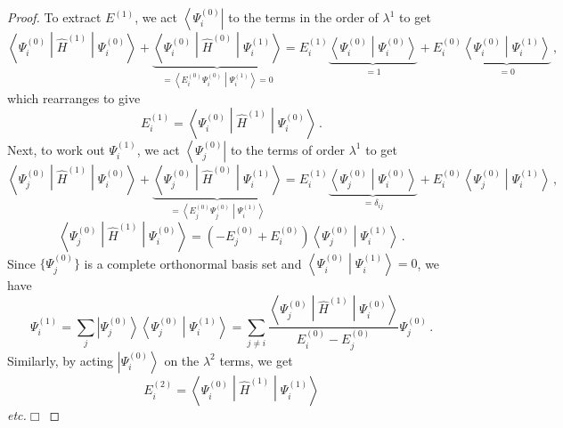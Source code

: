 \documentclass{article}
\theoremstyle{plain}\theoremheaderfont{\normalfont\itshape}\theorembodyfont{\rmfamily}\theoremseparator{.}\newtheorem*{rem}{Remark}\newtheorem*{ex}{Example}\newtheorem*{proof}{Proof}\newtheorem*{altp}{Alternative proof}
\theoremstyle{plain}\theoremheaderfont{\normalfont\bfseries}\theorembodyfont{\rmfamily}\theoremseparator{.}\newtheorem{thm}{Theorem}[section]\newtheorem{lem}[thm]{Lemma}\newtheorem{prop}[thm]{Proposition}\newtheorem*{cor}{Corollary}\newtheorem{defn}[thm]{Definition}\newtheorem{clm}[thm]{Claim}\newtheorem{clminproof}{Claim}
\theoremstyle{break}\theoremheaderfont{\normalfont\itshape}\theorembodyfont{\rmfamily}\theoremseparator{.\medskip}\newtheorem*{proofskip}{Proof}\newtheorem*{exs}{Examples}\newtheorem*{rems}{Remarks}
\theoremstyle{break}\theoremheaderfont{\normalfont\bfseries}\theorembodyfont{\rmfamily}\theoremseparator{.\medskip}\newtheorem{lemskip}[thm]{Lemma}\newtheorem{defnskip}[thm]{Definition}\newtheorem{propskip}[thm]{Proposition}\newtheorem{thmskip}[thm]{Theorem}
\numberwithin{equation}{section}
\newcommand{\qed}{\hfill\ensuremath{\Box}}
\newcommand{\bra}[1]{\left\langle #1 \right|}
\newcommand{\ket}[1]{\left| #1 \right\rangle}
\newcommand{\braket}[2]{\left\langle #1 \middle| #2 \right\rangle}
\newcommand{\mel}[3]{\left\langle #1 \middle| #2 \middle| #3 \right\rangle}
\newcommand{\expval}[2]{\left\langle #2 \middle| #1 \middle| #2 \right\rangle}
\begin{document}
\begin{proof}
        To extract \(E^{(1)}\), we act \(\bra{\Psi_i^{(0)}}\) to the terms in the order of \(\lambda^1\) to get
        \begin{equation}
            \expval{\hat{H}^{(1)}}{\Psi_i^{(0)}}+\underbrace{\mel{\Psi_i^{(0)}}{\hat{H}^{(0)}}{\Psi_i^{(1)}}}_{=\braket{E_i^{(0)}\Psi_i^{(0)}}{\Psi_i^{(1)}}=0}=E_i^{(1)}\underbrace{\braket{\Psi_i^{(0)}}{\Psi_i^{(0)}}}_{=1}+E_i^{(0)}\underbrace{\braket{\Psi_i^{(0)}}{\Psi_i^{(1)}}}_{=0}\,,
        \end{equation}
        which rearranges to give
        \begin{equation}
            E_i^{(1)}=\expval{\hat{H}^{(1)}}{\Psi_i^{(0)}}\,.
        \end{equation}
        Next, to work out \(\Psi_i^{(1)}\), we act \(\bra{\Psi_j^{(0)}}\) to the terms of order \(\lambda^1\) to get
        \begin{equation}
            \mel{\Psi_j^{(0)}}{\hat{H}^{(1)}}{\Psi_i^{(0)}}+\underbrace{\mel{\Psi_j^{(0)}}{\hat{H}^{(0)}}{\Psi_i^{(1)}}}_{=\braket{E_j^{(0)}\Psi_j^{(0)}}{\Psi_i^{(1)}}}=E_i^{(1)}\underbrace{\braket{\Psi_j^{(0)}}{\Psi_i^{(0)}}}_{=\delta_{ij}}+E_i^{(0)}\braket{\Psi_j^{(0)}}{\Psi_i^{(1)}}\,,
        \end{equation}
        \begin{equation}
            \mel{\Psi_j^{(0)}}{\hat{H}^{(1)}}{\Psi_i^{(0)}}=(-E_j^{(0)}+E_i^{(0)})\braket{\Psi_j^{(0)}}{\Psi_i^{(1)}}\,.
        \end{equation}
        Since \(\{\Psi_j^{(0)}\}\) is a complete orthonormal basis set and \(\braket{\Psi_i^{(0)}}{\Psi_i^{(1)}}=0\), we have
        \begin{equation}
            \Psi_i^{(1)}=\sum_{j}\ket{\Psi_j^{(0)}}\braket{\Psi_j^{(0)}}{\Psi_i^{(1)}}=\sum_{j\ne i}\frac{\mel{\Psi_j^{(0)}}{\hat{H}^{(1)}}{\Psi_i^{(0)}}}{E_{i}^{(0)}-E_j^{(0)}}\Psi_j^{(0)}\,.
        \end{equation}
        Similarly, by acting \(\ket{\Psi_i^{(0)}}\) on the \(\lambda^2\) terms, we get
        \begin{equation}
            E_i^{(2)}=\mel{\Psi_i^{(0)}}{\hat{H}^{(1)}}{\Psi_{i}^{(1)}}
        \end{equation}
        \textit{etc.}\qed
    \end{proof}
\end{document}
